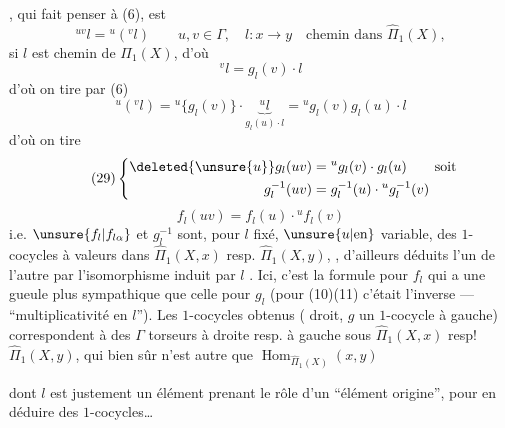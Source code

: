 , qui fait penser à (6), est
\[
\tag{28}{}^{uv}l={}^u({}^vl)
\qquad u,v\in\Gamma,\quad l:x\longrightarrow y\quad\text{chemin dans }\widehat\Pi_1(X),
\]
 si $l$ est chemin de $\Pi_1(X)$, d'où
\[
{}^vl=g_l(v)\cdot l
\]
 d'où on tire par (6)
\[
{}^u({}^vl)={}^u\{g_l(v)\}\cdot\underbrace{{}^ul}_{g_l(u)\cdot l}
={}^ug_l(v)g_l(u)\cdot l
\]
d'où on tire
\[
\tag{29}\left\{\begin{aligned}
\deleted{\unsure{u}}g_l(uv)&={}^ug_l(v)\cdot g_l(u)\qquad\text{soit}\\
g_l^{-1}(uv)&=g_l^{-1}(u)\cdot{}^ug_l^{-1}(v)
\end{aligned}\right.
\]
\[
\tag{30}f_l(uv)=f_l(u)\cdot{}^uf_l(v)
\]
i.e. $\unsure{f_l|f_{l\alpha}}$ et $g_l^{-1}$ sont, pour $l$ fixé, $\unsure{u|\text{en}}$ variable, des $1$-cocycles  à valeurs dans $\widehat\Pi_1(X,x)$ resp. $\widehat\Pi_1(X,y)$, , d'ailleurs déduits l'un de l'autre par l'isomorphisme
induit par $l$ . Ici, c'est la formule pour $f_l$ qui a une gueule plus sympathique que celle pour $g_l$ (pour (10)(11) c'était l'inverse ---  ``multiplicativité en $l$''). Les $1$-cocycles obtenus (  droit, $g$ un $1$-cocycle à gauche) correspondent à des $\Gamma$ torseurs à droite resp. à gauche sous $\widehat\Pi_1(X,x)$ resp! $\widehat\Pi_1(X,y)$, qui bien sûr n'est autre que $\operatorname{Hom}_{\widehat\Pi_1(X)}(x,y)$


dont $l$ est justement un élément prenant le rôle d'un ``élément origine'', pour en déduire des $1$-cocycles\ldots


